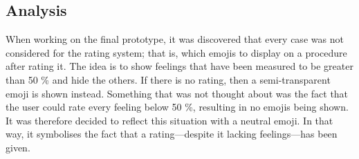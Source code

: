 \subsection{Analysis}

When working on the final prototype, it was discovered that every case was not considered for the rating system; that is, which emojis to display on a procedure after rating it. The idea is to show feelings that have been measured to be greater than 50 \% and hide the others. If there is no rating, then a semi-transparent emoji is shown instead. Something that was not thought about was the fact that the user could rate every feeling below 50 \%, resulting in no emojis being shown. It was therefore decided to reflect this situation with a neutral emoji. In that way, it symbolises the fact that a rating---despite it lacking feelings---has been given.

